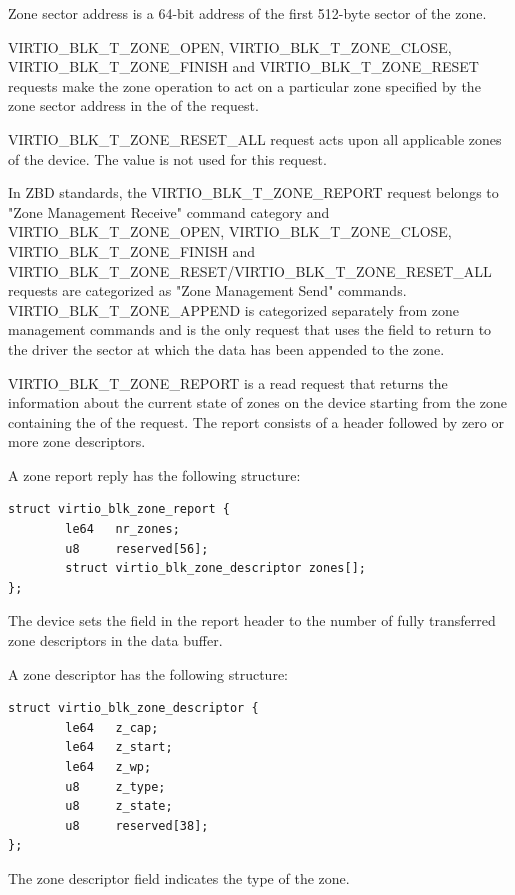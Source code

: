 Zone sector address is a 64-bit address of the first 512-byte sector of the
zone.

VIRTIO_BLK_T_ZONE_OPEN, VIRTIO_BLK_T_ZONE_CLOSE, VIRTIO_BLK_T_ZONE_FINISH and
VIRTIO_BLK_T_ZONE_RESET requests make the zone operation to act on a particular
zone specified by the zone sector address in the  of the request.

VIRTIO_BLK_T_ZONE_RESET_ALL request acts upon all applicable zones of the
device. The  value is not used for this request.

In ZBD standards, the VIRTIO_BLK_T_ZONE_REPORT request belongs to "Zone
Management Receive" command category and VIRTIO_BLK_T_ZONE_OPEN,
VIRTIO_BLK_T_ZONE_CLOSE, VIRTIO_BLK_T_ZONE_FINISH and
VIRTIO_BLK_T_ZONE_RESET/VIRTIO_BLK_T_ZONE_RESET_ALL requests are categorized as
"Zone Management Send" commands. VIRTIO_BLK_T_ZONE_APPEND is categorized
separately from zone management commands and is the only request that uses
the  field  to return
to the driver the sector at which the data has been appended to the zone.

VIRTIO_BLK_T_ZONE_REPORT is a read request that returns the information about
the current state of zones on the device starting from the zone containing the
 of the request. The report consists of a header followed by zero
or more zone descriptors.

A zone report reply has the following structure:

\begin{lstlisting}
struct virtio_blk_zone_report {
        le64   nr_zones;
        u8     reserved[56];
        struct virtio_blk_zone_descriptor zones[];
};
\end{lstlisting}

The device sets the  field in the report header to the number of
fully transferred zone descriptors in the data buffer.

A zone descriptor has the following structure:

\begin{lstlisting}
struct virtio_blk_zone_descriptor {
        le64   z_cap;
        le64   z_start;
        le64   z_wp;
        u8     z_type;
        u8     z_state;
        u8     reserved[38];
};
\end{lstlisting}

The zone descriptor field  
indicates the type of the zone.

